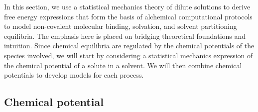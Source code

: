 \documentclass[9pt,bestpractices]{livecoms}
\begin{document}
In this section, we use a statistical mechanics theory of dilute solutions to derive free energy expressions that form the basis of alchemical computational protocols to model non-covalent molecular binding, solvation, and solvent partitioning equilibria. The emphasis here is placed on bridging theoretical foundations and intuition. Since chemical equilibria are regulated by the chemical potentials of the species involved, we will start by considering a statistical mechanics expression of the chemical potential of a solute in a solvent. We will then combine chemical potentials to develop models for each process.

\subsection{Chemical potential}
\end{document}
